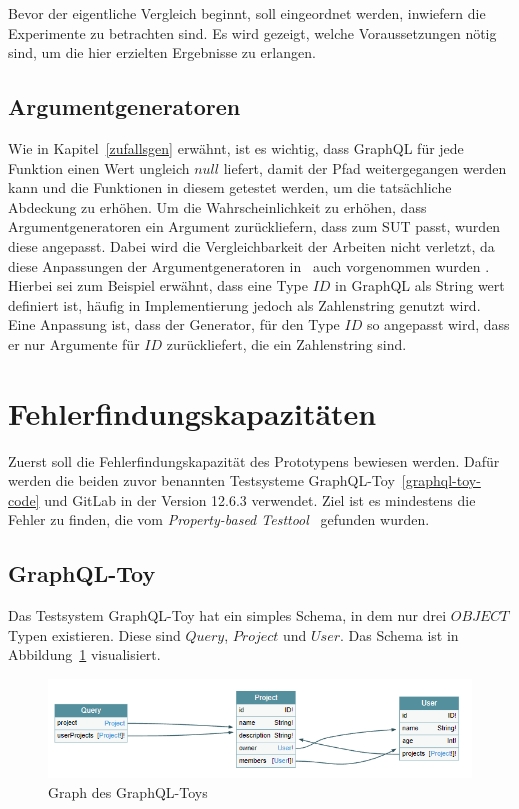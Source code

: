 Bevor der eigentliche Vergleich beginnt, soll eingeordnet werden, inwiefern die Experimente zu betrachten sind.
Es wird gezeigt, welche Voraussetzungen nötig sind, um die hier erzielten Ergebnisse zu erlangen.

\subsection{Argumentgeneratoren}

Wie in Kapitel~\ref{zufallsgen} erwähnt, ist es wichtig, dass GraphQL für jede Funktion einen Wert ungleich $null$ liefert,
damit der Pfad weitergegangen werden kann und die Funktionen in diesem getestet werden, um die tatsächliche Abdeckung zu erhöhen.
Um die Wahrscheinlichkeit zu erhöhen, dass Argumentgeneratoren ein Argument zurückliefern, dass zum SUT passt, wurden diese angepasst.
Dabei wird die Vergleichbarkeit der Arbeiten nicht verletzt, da diese Anpassungen der Argumentgeneratoren in~\cite{property-based-testing} auch vorgenommen wurden \cite[vgl. Experimental Setup and Method]{property-based-testing}.
Hierbei sei zum Beispiel erwähnt, dass eine Type $ID$ in GraphQL als String wert definiert ist, häufig in Implementierung jedoch als Zahlenstring genutzt wird.
Eine Anpassung ist, dass der Generator, für den Type $ID$ so angepasst wird, dass er nur Argumente für $ID$ zurückliefert, die ein Zahlenstring sind.

\section{Fehlerfindungskapazitäten}

Zuerst soll die Fehlerfindungskapazität des Prototypens bewiesen werden.
Dafür werden die beiden zuvor benannten Testsysteme GraphQL-Toy~\ref{graphql-toy-code} und GitLab in der Version 12.6.3 verwendet.
Ziel ist es mindestens die Fehler zu finden, die vom \textit{Property-based Testtool}~\cite{property-based-testing} gefunden wurden.

\subsection{GraphQL-Toy}

Das Testsystem GraphQL-Toy hat ein simples Schema, in dem nur drei $OBJECT$ Typen existieren.
Diese sind $Query$, $Project$ und $User$.
Das Schema ist in Abbildung~\ref{gqltoysschm} visualisiert.
\begin{figure}
    \begin{center}
        \includegraphics[width=\textwidth,height=\textheight,keepaspectratio]{img/graphqltoy}
    \end{center}
    \caption{Graph des GraphQL-Toys}
    \label{gqltoysschm}
\end{figure}


